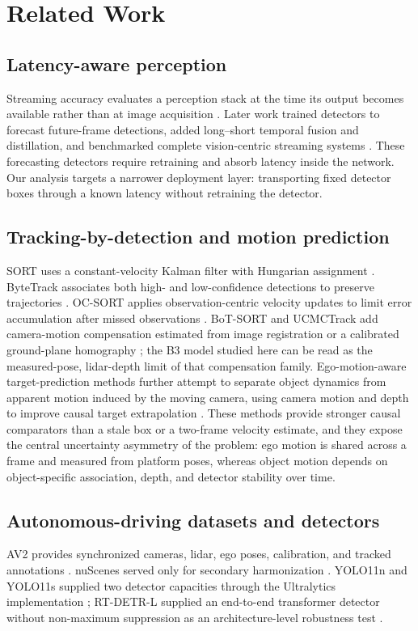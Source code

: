 \documentclass[journal]{IEEEtran}
\begin{document}
\section{Related Work}
\label{sec:related}
\subsection{Latency-aware perception}
Streaming accuracy evaluates a perception stack at the time its output becomes available rather than at image acquisition \cite{Li2020Streaming}. Later work trained detectors to forecast future-frame detections, added long--short temporal fusion and distillation, and benchmarked complete vision-centric streaming systems \cite{Yang2022Streaming,Li2023LongShortNet,He2023DAMOStreamNet,Wang2023ASAP}. These forecasting detectors require retraining and absorb latency inside the network. Our analysis targets a narrower deployment layer: transporting fixed detector boxes through a known latency without retraining the detector.

\subsection{Tracking-by-detection and motion prediction}
SORT uses a constant-velocity Kalman filter with Hungarian assignment \cite{Bewley2016SORT,Kuhn1955}. ByteTrack associates both high- and low-confidence detections to preserve trajectories \cite{Zhang2022ByteTrack}. OC-SORT applies observation-centric velocity updates to limit error accumulation after missed observations \cite{Cao2023OCSORT}. BoT-SORT and UCMCTrack add camera-motion compensation estimated from image registration or a calibrated ground-plane homography \cite{Aharon2022BoTSORT,Yi2024UCMCTrack}; the B3 model studied here can be read as the measured-pose, lidar-depth limit of that compensation family. Ego-motion-aware target-prediction methods further attempt to separate object dynamics from apparent motion induced by the moving camera, using camera motion and depth to improve causal target extrapolation \cite{Mahdian2024EMAP}. These methods provide stronger causal comparators than a stale box or a two-frame velocity estimate, and they expose the central uncertainty asymmetry of the problem: ego motion is shared across a frame and measured from platform poses, whereas object motion depends on object-specific association, depth, and detector stability over time.

\subsection{Autonomous-driving datasets and detectors}
AV2 provides synchronized cameras, lidar, ego poses, calibration, and tracked annotations \cite{Wilson2021AV2}. nuScenes served only for secondary harmonization \cite{Caesar2020nuScenes}. YOLO11n and YOLO11s supplied two detector capacities through the Ultralytics implementation \cite{Ultralytics2024}; RT-DETR-L supplied an end-to-end transformer detector without non-maximum suppression as an architecture-level robustness test \cite{Zhao2024RTDETR}.
\end{document}
